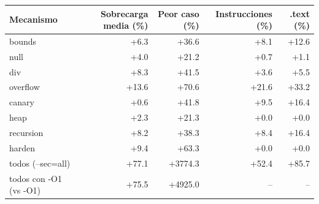 \begin{tabular}{lrrrr}\toprule
Mecanismo & Sobrecarga media (\%) & Peor caso (\%) & Instrucciones (\%) & .text (\%) \\\midrule
bounds & +6.3 & +36.6 & +8.1 & +12.6 \\
null & +4.0 & +21.2 & +0.7 & +1.1 \\
div & +8.3 & +41.5 & +3.6 & +5.5 \\
overflow & +13.6 & +70.6 & +21.6 & +33.2 \\
canary & +0.6 & +41.8 & +9.5 & +16.4 \\
heap & +2.3 & +21.3 & +0.0 & +0.0 \\
recursion & +8.2 & +38.3 & +8.4 & +16.4 \\
harden & +9.4 & +63.3 & +0.0 & +0.0 \\
todos (--sec=all) & +77.1 & +3774.3 & +52.4 & +85.7 \\
\midrule
todos con -O1 (vs -O1) & +75.5 & +4925.0 & -- & -- \\
\bottomrule\end{tabular}
